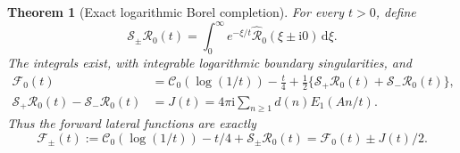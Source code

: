 \documentclass[11pt,a4paper]{article}
\numberwithin{equation}{section}
\newtheorem{theorem}{Theorem}[section]
\theoremstyle{definition}\newtheorem{definition}[theorem]{Definition}
\theoremstyle{remark}\newtheorem{remark}[theorem]{Remark}
\newcommand{\dd}{\,\mathrm d}
\newcommand{\ii}{\mathrm i}
\newcommand{\F}{\mathcal F}\newcommand{\CC}{\mathcal C}
\newcommand{\B}{\widehat{\mathcal R}}
\newcommand{\Sc}{\mathcal S}
\begin{document}
\begin{theorem}[Exact logarithmic Borel completion]
\label{thm:median}
For every $t>0$, define
\[
 \Sc_\pm\mathcal R_0(t)=\int_0^\infty e^{-\xi/t}\B_0(\xi\pm\ii0)\dd\xi.
\]
The integrals exist, with integrable logarithmic boundary singularities,
and
\begin{align}
 \F_0(t)&=\CC_0(\log(1/t))-\frac t4
 +\frac12\{\Sc_+\mathcal R_0(t)+\Sc_-\mathcal R_0(t)\},
 \label{eq:median-exact}\\
 \Sc_+\mathcal R_0(t)-\Sc_-\mathcal R_0(t)
 &=J(t)=4\pi\ii\sum_{n\ge1}d(n)E_1(An/t).
 \label{eq:stokes-exact}
\end{align}
Thus the forward lateral functions are exactly
\begin{equation}\label{eq:forward-laterals}
 \F_\pm(t):=\CC_0(\log(1/t))-t/4+\Sc_\pm\mathcal R_0(t)
 =\F_0(t)\pm J(t)/2.
\end{equation}
\end{theorem}
\end{document}
